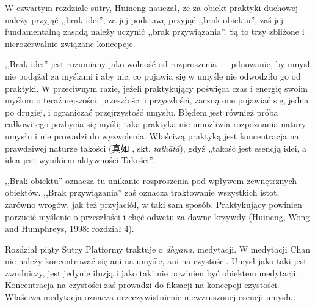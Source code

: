 
W czwartym rozdziale sutry, Huineng nauczał, że za obiekt praktyki duchowej należy przyjąć ,,brak idei'', za jej podstawę przyjąć ,,brak obiektu'', zaś jej fundamentalną zasadą należy uczynić ,,brak przywiązania''. Są to trzy zbliżone i nierozerwalnie związane koncepcje.

,,Brak idei'' jest rozumiany jako wolność od rozproszenia --- pilnowanie, by umysł nie podążał za myślami i aby nic, co pojawia się w umyśle nie odwodziło go od praktyki. W przeciwnym razie, jeżeli praktykujący poświęca czas i energię swoim myślom o teraźniejszości, przeszłości i przyszłości, zaczną one pojawiać się, jedna po drugiej, i ograniczać przejrzystość umysłu. Błędem jest również próba całkowitego pozbycia się myśli; taka praktyka nie umożliwia rozpoznania natury umysłu i nie prowadzi do wyzwolenia. Właściwą praktyką jest koncentracja na prawdziwej naturze takości (真如 , skt. \emph{tathātā}), gdyż „takość jest esencją idei, a idea jest wynikiem aktywności Takości”.

,,Brak obiektu'' oznacza tu unikanie rozproszenia pod wpływem zewnętrznych obiektów. ,,Brak przywiązania'' zaś oznacza traktowanie wszystkich istot, zarówno wrogów, jak też przyjaciół, w taki sam sposób. Praktykujący powinien porzucić myślenie o przeszłości i chęć odwetu za dawne krzywdy (Huineng, Wong and Humphreys, 1998: rozdział 4).

Rozdział piąty Sutry Platformy traktuje o \emph{dhyana}, medytacji. W medytacji Chan nie należy koncentrować się ani na umyśle, ani na czystości. Umysł jako taki jest zwodniczy, jest jedynie iluzją i jako taki nie powinien być obiektem medytacji. Koncentracja na czystości zaś prowadzi do fiksacji na koncepcji czystości. Właściwa medytacja oznacza urzeczywistnienie niewzruszonej esencji umysłu.

